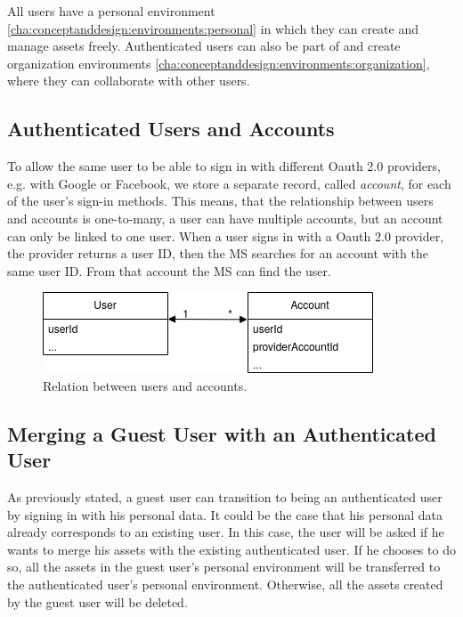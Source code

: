 All users have a personal environment \ref{cha:conceptanddesign:environments:personal}
in which they can create and manage assets freely.
Authenticated users can also be part of and create organization environments
\ref{cha:conceptanddesign:environments:organization},
where they can collaborate with other users.

\subsection{Authenticated Users and Accounts}

To allow the same user to be able to sign in with different Oauth 2.0 providers, e.g. with
Google or Facebook,
we store a separate record, called \textit{account}, for each of the user's sign-in methods.
This means, that the relationship between users and accounts is one-to-many,
a user can have multiple accounts, but an account can only be linked to one user.
When a user signs in with a Oauth 2.0 provider, the provider returns a user ID, 
then the MS searches for an account with the same user ID.
From that account the MS can find the user.

\begin{figure}[H]
	\centering
	\includegraphics[scale=0.6]{images/users-accounts-relation.drawio.png}
	\caption{Relation between users and accounts.}
	\vspace{-1em} %
\end{figure}

\subsection{Merging a Guest User with an Authenticated User}
\label{cha:conceptanddesign:users:mergeguestuser}

As previously stated, a guest user can transition to being an authenticated user by
signing in with his personal data.
It could be the case that his personal data already corresponds to an existing user.
In this case, the user will be asked if he wants to merge his assets with the existing
authenticated user.
If he chooses to do so, all the assets in the guest user's personal environment will be
transferred to the authenticated user's personal environment.
Otherwise, all the assets created by the guest user will be deleted.

